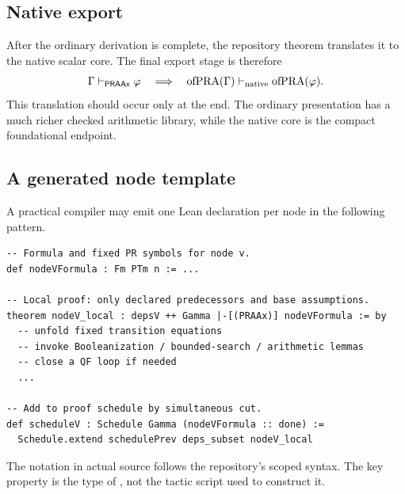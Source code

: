 \subsection{Native export}

After the ordinary derivation is complete, the repository theorem
 translates it to the native scalar core.  The final export stage
is therefore
\[
  \Gamma\vdash_{\mathsf{PRAAx}}\varphi
  \quad\Longrightarrow\quad
  \operatorname{ofPRA}(\Gamma)\vdash_{\mathrm{native}}
  \operatorname{ofPRA}(\varphi).
\]
This translation should occur only at the end.  The ordinary presentation has a much
richer checked arithmetic library, while the native core is the compact foundational
endpoint.

\subsection{A generated node template}

A practical compiler may emit one Lean declaration per node in the following pattern.

\begin{lstlisting}
-- Formula and fixed PR symbols for node v.
def nodeVFormula : Fm PTm n := ...

-- Local proof: only declared predecessors and base assumptions.
theorem nodeV_local : depsV ++ Gamma |-[(PRAAx)] nodeVFormula := by
  -- unfold fixed transition equations
  -- invoke Booleanization / bounded-search / arithmetic lemmas
  -- close a QF loop if needed
  ...

-- Add to proof schedule by simultaneous cut.
def scheduleV : Schedule Gamma (nodeVFormula :: done) :=
  Schedule.extend schedulePrev deps_subset nodeV_local
\end{lstlisting}

The notation in actual source follows the repository's scoped syntax.  The key property
is the type of , not the tactic script used to construct it.
